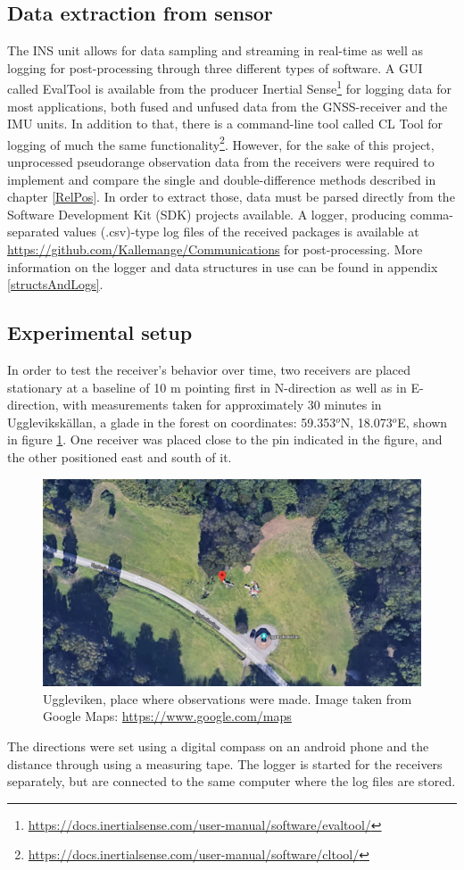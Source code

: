 \subsection{Data extraction from sensor}
The INS unit allows for data sampling and streaming in real-time as well as logging for post-processing through three different types of software. A GUI called EvalTool is available from the producer Inertial Sense\footnote{\url{https://docs.inertialsense.com/user-manual/software/evaltool/}} for logging data for most applications, both fused and unfused data from the GNSS-receiver and the IMU units. In addition to that, there is a command-line tool called CL Tool for logging of much the same functionality\footnote{\url{https://docs.inertialsense.com/user-manual/software/cltool/}}. However, for the sake of this project, unprocessed pseudorange observation data from the receivers were required to implement and compare the single and double-difference methods described in chapter \ref{RelPos}. In order to extract those, data must be parsed directly from the Software Development Kit (SDK) projects available. A logger, producing comma-separated values (.csv)-type log files of the received packages is available at \url{https://github.com/Kallemange/Communications} for post-processing. More information on the logger and data structures in use can be found in appendix \ref{structsAndLogs}.
\subsection{Experimental setup}\label{experimentalSetup}
In order to test the receiver's behavior over time, two receivers are placed stationary at a baseline of 10 m pointing first in N-direction as well as in E-direction, with measurements taken for approximately 30 minutes in Uggleviksk\"allan, a glade in the forest on coordinates: 59.353$^o$N, 18.073$^o$E, shown in figure \ref{fig:Uggleviken}. One receiver was placed close to the pin indicated in the figure, and the other positioned east and south of it.
\begin{figure}[!h]
\includegraphics[scale=0.4]{Method/Uggleviken}
\caption{\label{fig:Uggleviken} Uggleviken, place where observations were made. Image taken from Google Maps: \url{https://www.google.com/maps}}
\end{figure} 
The directions were set using a 
digital compass on an android phone and the distance through using a measuring tape. The logger is started for the receivers separately, but are connected to the same computer where the log files are stored. 


